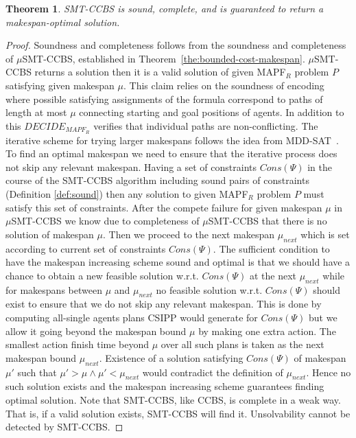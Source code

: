 \documentclass[review]{elsarticle}
\newtheorem{theorem}{Theorem}
\newcommand{\decidemapfr}{\ensuremath{\mathit{DECIDE_{MAPF_R}}}\xspace}
\newcommand\roni[1]{\nb{\textbf{Roni:}}{green}{#1}}
\newcommand\pavel[1]{\nb{\textbf{Pavel:}}{blue}{#1}}
\newcommand{\ccbs}{\ac{CCBS}\xspace}
\newcommand{\mapfr}{\ac{MAPF}$_R$\xspace}
\newcommand{\mddsat}{MDD-SAT\xspace}
\newcommand{\smtccbs}{SMT-CCBS\xspace}
\begin{document}
\begin{theorem}
\smtccbs is sound, complete, and is guaranteed to return a makespan-optimal solution. 
\label{the:optimal-makespan}
\end{theorem}
\begin{proof}
Soundness and completeness follows from the soundness and completeness of $\mu$\smtccbs, established in Theorem~\ref{the:bounded-cost-makespan}. 
$\mu$\smtccbs returns a solution then it is a valid solution of given \mapfr problem $P$ satisfying given makespan $\mu$. This claim relies on the soundness of encoding where possible satisfying assignments of the formula correspond to paths of length at most $\mu$ connecting starting and goal positions of agents. In addition to this \decidemapfr verifies that individual paths are non-conflicting.
The iterative scheme for trying larger makespans follows the idea from \mddsat~\cite{DBLP:conf/ecai/SurynekFSB16}. To find an optimal makespan we need to ensure that the iterative process does not skip any relevant makespan. Having a set of constraints $Cons(\Psi)$ in the course of the \smtccbs algorithm including sound pairs of constraints (Definition \ref{def:sound}) then any solution to given \mapfr problem $P$ must satisfy this set of constraints. After the compete failure for given makespan $\mu$ in $\mu$\smtccbs we know due to completeness of $\mu$\smtccbs that there is no solution of makespan $\mu$. Then we proceed to the next makespan $\mu_{next}$ which is set according to current set of constraints $Cons(\Psi)$.
The sufficient condition to have the makespan increasing scheme sound and optimal is that we should have a chance to obtain a new feasible solution w.r.t. $Cons(\Psi)$ at the next $\mu_{next}$ while for makespans between $\mu$ and $\mu_{next}$ no feasible solution w.r.t. $Cons(\Psi)$ should exist to ensure that we do not skip any relevant makespan. This is done by computing all-single agents plans CSIPP would generate for $Cons(\Psi)$ but we allow it going beyond the makespan bound $\mu$ by making one extra action. The smallest action finish time beyond $\mu$ over all such plans is taken as the next makespan bound $\mu_{next}$. Existence of a solution satisfying $Cons(\Psi)$ of makespan $\mu'$ such that $\mu' > \mu \wedge \mu' < \mu_{next}$ would contradict the definition of $\mu_{next}$. Hence no such solution exists and the makespan increasing scheme guarantees finding optimal solution. %
Note that \smtccbs, like \ccbs, is complete in a weak way. That is, if a valid solution exists, \smtccbs will find it. Unsolvability cannot be detected by \smtccbs.
\end{proof}
\end{document}
